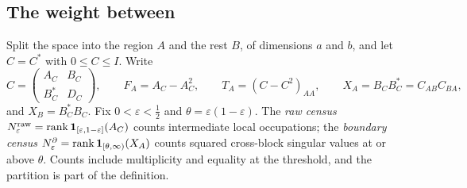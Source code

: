 \subsection{The weight between}\label{sec:cross}
Split the space into the region $A$ and the rest $B$, of dimensions $a$ and $b$, and let $C=C^*$ with $0\le C\le I$. Write
\[
C=\begin{pmatrix}A_C&B_C\\B_C^*&D_C\end{pmatrix},\qquad F_A=A_C-A_C^2,\qquad T_A=(C-C^2)_{AA},\qquad X_A=B_CB_C^*=C_{AB}C_{BA},
\]
and $X_B=B_C^*B_C$. Fix $0<\varepsilon<\tfrac12$ and $\theta=\varepsilon(1-\varepsilon)$. The \emph{raw census} $N^{\mathrm{raw}}_\varepsilon=\operatorname{rank}\mathbf 1_{[\varepsilon,1-\varepsilon]}(A_C)$ counts intermediate local occupations; the \emph{boundary census} $N^\partial_\varepsilon=\operatorname{rank}\mathbf 1_{[\theta,\infty)}(X_A)$ counts squared cross-block singular values at or above $\theta$. Counts include multiplicity and equality at the threshold, and the partition is part of the definition.

